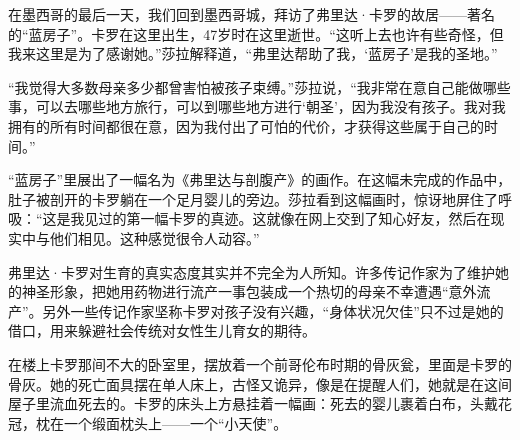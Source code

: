 \documentclass[12pt,oneside]{book}
\begin{document}
\begin{bookref}[frametitle={\cite{好好告别：世界葬礼观察手记}}]
在墨西哥的最后一天，我们回到墨西哥城，拜访了弗里达·卡罗的故居——著名的“蓝房子”。卡罗在这里出生，47岁时在这里逝世。“这听上去也许有些奇怪，但我来这里是为了感谢她。”莎拉解释道，“弗里达帮助了我，‘蓝房子’是我的圣地。”

“我觉得大多数母亲多少都曾害怕被孩子束缚。”莎拉说，“我非常在意自己能做哪些事，可以去哪些地方旅行，可以到哪些地方进行‘朝圣’，因为我没有孩子。我对我拥有的所有时间都很在意，因为我付出了可怕的代价，才获得这些属于自己的时间。”

“蓝房子”里展出了一幅名为《弗里达与剖腹产》的画作。在这幅未完成的作品中，肚子被剖开的卡罗躺在一个足月婴儿的旁边。莎拉看到这幅画时，惊讶地屏住了呼吸：“这是我见过的第一幅卡罗的真迹。这就像在网上交到了知心好友，然后在现实中与他们相见。这种感觉很令人动容。”

弗里达·卡罗对生育的真实态度其实并不完全为人所知。许多传记作家为了维护她的神圣形象，把她用药物进行流产一事包装成一个热切的母亲不幸遭遇“意外流产”。另外一些传记作家坚称卡罗对孩子没有兴趣，“身体状况欠佳”只不过是她的借口，用来躲避社会传统对女性生儿育女的期待。

在楼上卡罗那间不大的卧室里，摆放着一个前哥伦布时期的骨灰瓮，里面是卡罗的骨灰。她的死亡面具摆在单人床上，古怪又诡异，像是在提醒人们，她就是在这间屋子里流血死去的。卡罗的床头上方悬挂着一幅画：死去的婴儿裹着白布，头戴花冠，枕在一个缎面枕头上——一个“小天使”。

\end{bookref}
\end{document}

